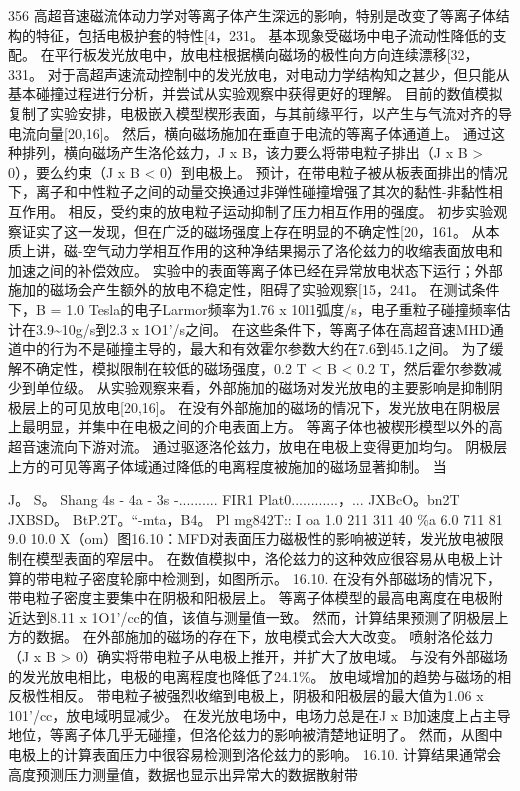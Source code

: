\documentclass[UTF8,11pt,a4paper,openany,fontset=fandol]{ctexbook}
\begin{document}
356 高超音速磁流体动力学对等离子体产生深远的影响，特别是改变了等离子体结构的特征，包括电极护套的特性[4，231。 基本现象受磁场中电子流动性降低的支配。 在平行板发光放电中，放电柱根据横向磁场的极性向方向连续漂移[32，331。 对于高超声速流动控制中的发光放电，对电动力学结构知之甚少，但只能从基本碰撞过程进行分析，并尝试从实验观察中获得更好的理解。 目前的数值模拟复制了实验安排，电极嵌入模型楔形表面，与其前缘平行，以产生与气流对齐的导电流向量[20,16]。 然后，横向磁场施加在垂直于电流的等离子体通道上。 通过这种排列，横向磁场产生洛伦兹力，J x B，该力要么将带电粒子排出（J x B > 0），要么约束（J x B < 0）到电极上。 预计，在带电粒子被从板表面排出的情况下，离子和中性粒子之间的动量交换通过非弹性碰撞增强了其次的黏性-非黏性相互作用。 相反，受约束的放电粒子运动抑制了压力相互作用的强度。 初步实验观察证实了这一发现，但在广泛的磁场强度上存在明显的不确定性[20，161。 从本质上讲，磁-空气动力学相互作用的这种净结果揭示了洛伦兹力的收缩表面放电和加速之间的补偿效应。 实验中的表面等离子体已经在异常放电状态下运行；外部施加的磁场会产生额外的放电不稳定性，阻碍了实验观察[15，241。 在测试条件下，B = 1.0 Tesla的电子Larmor频率为1.76 x 10l1弧度/s，电子重粒子碰撞频率估计在3.9\textasciitilde{}10g/s到2.3 x 1O1'/s之间。 在这些条件下，等离子体在高超音速MHD通道中的行为不是碰撞主导的，最大和有效霍尔参数大约在7.6到45.1之间。 为了缓解不确定性，模拟限制在较低的磁场强度，0.2 T < B < 0.2 T，然后霍尔参数减少到单位级。 从实验观察来看，外部施加的磁场对发光放电的主要影响是抑制阴极层上的可见放电[20,16]。 在没有外部施加的磁场的情况下，发光放电在阴极层上最明显，并集中在电极之间的介电表面上方。 等离子体也被楔形模型以外的高超音速流向下游对流。 通过驱逐洛伦兹力，放电在电极上变得更加均匀。 阴极层上方的可见等离子体域通过降低的电离程度被施加的磁场显著抑制。 当

J。 S。 Shang 4s - 4a - 3s -.......... FIR1 Plat0............，... JXBcO。bn2T JXBSD。 BtP.2T。“-mta，B4。 Pl mg842T:: I oa 1.0 211 311 40 \%a 6.0 711 81 9.0 10.0 X（om）图16.10：MFD对表面压力磁极性的影响被逆转，发光放电被限制在模型表面的窄层中。 在数值模拟中，洛伦兹力的这种效应很容易从电极上计算的带电粒子密度轮廓中检测到，如图所示。 16.10. 在没有外部磁场的情况下，带电粒子密度主要集中在阴极和阳极层上。 等离子体模型的最高电离度在电极附近达到8.11 x 1O1'/cc的值，该值与测量值一致。 然而，计算结果预测了阴极层上方的数据。 在外部施加的磁场的存在下，放电模式会大大改变。 喷射洛伦兹力（J x B > 0）确实将带电粒子从电极上推开，并扩大了放电域。 与没有外部磁场的发光放电相比，电极的电离程度也降低了24.1\%。 放电域增加的趋势与磁场的相反极性相反。 带电粒子被强烈收缩到电极上，阴极和阳极层的最大值为1.06 x 101'/cc，放电域明显减少。 在发光放电场中，电场力总是在J x B加速度上占主导地位，等离子体几乎无碰撞，但洛伦兹力的影响被清楚地证明了。 然而，从图中电极上的计算表面压力中很容易检测到洛伦兹力的影响。 16.10. 计算结果通常会高度预测压力测量值，数据也显示出异常大的数据散射带
\end{document}
